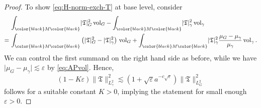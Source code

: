 \documentclass[11pt,leqno,textwidth=10cm]{amsart}
\numberwithin{equation}{section}
\theoremstyle{definition}
\theoremstyle{plain}
\newcommand{\1}{\mathbbm{1}}
\newcommand{\vol}[1]{{\text{\normalfont{vol}}}_{#1}}
\renewcommand{\epsilon}{\varepsilon}
\newcommand{\change}[1]{\color{black}#1\color{black}}
\begin{document}
\begin{proof}
To show \eqref{eq:H-norm-exch-T} at base level, consider
\begin{align*}
&\,\int_{\change{M}} \lvert\mathfrak{T}\rvert_G^2\,\vol{G}-\int_{\change{M}}\lvert\mathfrak{T}\rvert_{\gamma}^2\,\vol{\gamma}\\
=&\,\int_{\change{M}} \left(\lvert\mathfrak{T}\rvert_G^2-\lvert\mathfrak{T}\rvert_\gamma^2\right)\,\vol{G}+\int_{\change{M}}\lvert\mathfrak{T}\rvert_\gamma^2\frac{\mu_G-\mu_\gamma}{\mu_\gamma}\,\vol{\gamma}\,.
\end{align*}
We can control the first summand on the right hand side %
as before, while we have $\lvert\mu_G-\mu_\gamma\rvert\lesssim \epsilon$ by \eqref{eq:APvol}. Hence,
\[(1-K\epsilon)\|\mathfrak{T}\|_{L^2_\gamma}^2\lesssim (1+\sqrt{\epsilon}a^{-c\sqrt{\epsilon}})\|\mathfrak{T}\|_{L^2_G}^2\]
follows for a suitable constant $K>0$, implying the statement for small enough $\epsilon>0$.


\end{proof}
\end{document}
